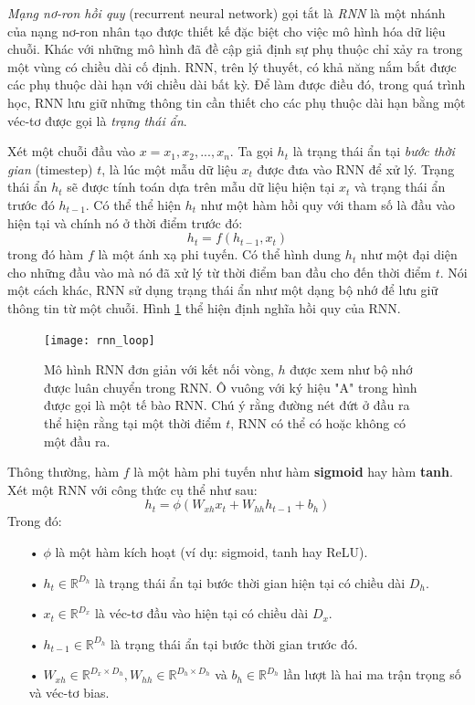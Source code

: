 \textit{Mạng nơ-ron hồi quy} (recurrent neural network) \cite{elman1990} gọi tắt là \textit{RNN} là một nhánh của nạng nơ-ron nhân tạo được thiết kế đặc biệt cho việc mô hình hóa dữ liệu chuỗi. Khác với những mô hình đã đề cập giả định sự phụ thuộc chỉ xảy ra trong một vùng có chiều dài cố định. RNN, trên lý thuyết, có khả năng nắm bắt được các phụ thuộc dài hạn với chiều dài bất kỳ. Để làm được điều đó, trong quá trình học, RNN lưu giữ những thông tin cần thiết cho các phụ thuộc dài hạn bằng một véc-tơ được gọi là \textit{trạng thái ẩn}.

Xét một chuỗi đầu vào $x={x_1,x_2,...,x_n}$. Ta gọi $h_t$ là trạng thái ẩn tại \textit{bước thời gian} (timestep) $t$, là lúc một mẫu dữ liệu $x_t$ được đưa vào RNN để xử lý. Trạng thái ẩn $h_t$ sẽ được tính toán dựa trên mẫu dữ liệu hiện tại $x_t$ và trạng thái ẩn trước đó $h_{t-1}$. Có thể thể hiện $h_t$ như một hàm hồi quy với tham số là đầu vào hiện tại và chính nó ở thời điểm trước đó:
\begin{equation} \label{basicRnnEquation}
	h_t = f \left(h_{t-1}, x_t \right)
\end{equation}
trong đó hàm $f$ là một ánh xạ phi tuyến. Có thể hình dung $h_t$ như một đại diện cho những đầu vào mà nó đã xử lý từ thời điểm ban đầu cho đến thời điểm $t$. Nói một cách khác, RNN sử dụng trạng thái ẩn như một dạng bộ nhớ để lưu giữ thông tin từ một chuỗi. Hình \ref{fig_rnn_loop} thể hiện định nghĩa hồi quy của RNN.

\begin{figure}
	\centering
	\texttt{[image: rnn\_loop]}
	\caption[Mô hình RNN với kết nối vòng]{Mô hình RNN đơn giản với kết nối vòng, \textbf{$h$} được xem như bộ nhớ được luân chuyển trong RNN. Ô vuông với ký hiệu "A" trong hình được gọi là một tế bào RNN. Chú ý rằng đường nét đứt ở đầu ra thể hiện rằng tại một thời điểm $t$, RNN có thể có hoặc không có một đầu ra.}
	\label{fig_rnn_loop}
\end{figure}
Thông thường, hàm $f$ là một hàm phi tuyến như hàm \textbf{sigmoid} hay hàm \textbf{tanh}. Xét một RNN với công thức cụ thể như sau:
\begin{equation} \label{rnnWithTanh}
	h_t = \phi \left(W_{xh} x_t + W_{hh}h_{t-1} + b_h \right)
\end{equation}
Trong đó:
\begin{itemize}
	\item[•] $\phi$ là một hàm kích hoạt (ví dụ: sigmoid, tanh hay ReLU).
	\item[•] $h_{t} \in \mathbb{R}^{D_h}$ là trạng thái ẩn tại bước thời gian hiện tại có chiều dài $D_h$.
	\item[•] $x_t \in \mathbb{R}^{D_x}$ là véc-tơ đầu vào hiện tại có chiều dài $D_x$.
	\item[•] $h_{t-1} \in \mathbb{R}^{D_h}$ là trạng thái ẩn tại bước thời gian trước đó.
	\item[•] $W_{xh} \in \mathbb{R}^{D_x \times D_h}, W_{hh} \in \mathbb{R}^{D_h \times D_h}$ và $b_h \in \mathbb{R}^{D_h}$ lần lượt là hai ma trận trọng số và véc-tơ bias.
\end{itemize}

